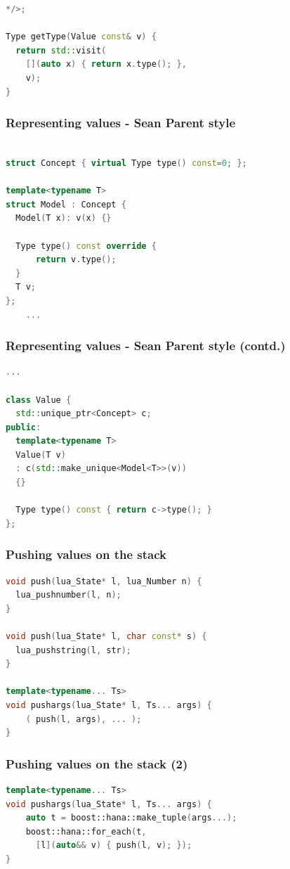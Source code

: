 \documentclass{beamer}
\begin{document}
\begin{frame}[fragile]
\begin{lstlisting}[language={C++}]
*/>;

Type getType(Value const& v) {
  return std::visit(
    [](auto x) { return x.type(); },
    v);  
}
  \end{lstlisting}
\end{frame}


\begin{frame}[fragile]
  \frametitle{Representing values - Sean Parent style}

  \begin{lstlisting}[language={C++}]

struct Concept { virtual Type type() const=0; };
  
template<typename T>
struct Model : Concept {
  Model(T x): v(x) {}  
    
  Type type() const override {
      return v.type();
  }
  T v;
};
    ...
  \end{lstlisting}
\end{frame}
\begin{frame}[fragile]
    \frametitle{Representing values - Sean Parent style (contd.)}
    \begin{lstlisting}[language={C++}]
    ...
      
class Value {
  std::unique_ptr<Concept> c;
public:
  template<typename T>
  Value(T v)
  : c(std::make_unique<Model<T>>(v))
  {}

  Type type() const { return c->type(); }
};
  \end{lstlisting}
\end{frame}


\begin{frame}[fragile]
  \frametitle{Pushing values on the stack}

  \begin{lstlisting}[language={C++}]
void push(lua_State* l, lua_Number n) {
  lua_pushnumber(l, n);
}

void push(lua_State* l, char const* s) {
  lua_pushstring(l, str);
}

template<typename... Ts>
void pushargs(lua_State* l, Ts... args) {
    ( push(l, args), ... );
}
  \end{lstlisting}
\end{frame}

\begin{frame}[fragile]
  \frametitle{Pushing values on the stack (2)}

  \begin{lstlisting}[language={C++}]
template<typename... Ts>
void pushargs(lua_State* l, Ts... args) {
    auto t = boost::hana::make_tuple(args...);
    boost::hana::for_each(t,
      [l](auto&& v) { push(l, v); });
}
  \end{lstlisting}
\end{frame}
\end{document}
